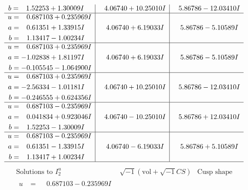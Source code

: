 \documentclass[1p]{elsarticle_modified}
\theoremstyle{definition}
\newcommand{\I}{\sqrt{-1}}
\begin{document}
$$\begin{array}{c|c|c}
\begin{aligned}
b &= \phantom{-}1.52253 + 1.30009 I\end{aligned}
 & \phantom{-}4.06740 + 10.25010 I & \phantom{-}5.86786 - 12.03410 I \\ \hline\begin{aligned}
u &= \phantom{-}0.687103 + 0.235969 I \\
a &= \phantom{-}0.61351 + 1.33915 I \\
b &= \phantom{-}1.13417 - 1.00234 I\end{aligned}
 & \phantom{-}4.06740 + 6.19033 I & \phantom{-}5.86786 - 5.10589 I \\ \hline\begin{aligned}
u &= \phantom{-}0.687103 + 0.235969 I \\
a &= -1.02838 + 1.81197 I \\
b &= -0.105545 - 1.064900 I\end{aligned}
 & \phantom{-}4.06740 + 6.19033 I & \phantom{-}5.86786 - 5.10589 I \\ \hline\begin{aligned}
u &= \phantom{-}0.687103 + 0.235969 I \\
a &= -2.56334 - 1.01181 I \\
b &= -0.246555 + 0.624356 I\end{aligned}
 & \phantom{-}4.06740 + 10.25010 I & \phantom{-}5.86786 - 12.03410 I \\ \hline\begin{aligned}
u &= \phantom{-}0.687103 - 0.235969 I \\
a &= \phantom{-}0.041834 + 0.923046 I \\
b &= \phantom{-}1.52253 - 1.30009 I\end{aligned}
 & \phantom{-}4.06740 - 10.25010 I & \phantom{-}5.86786 + 12.03410 I \\ \hline\begin{aligned}
u &= \phantom{-}0.687103 - 0.235969 I \\
a &= \phantom{-}0.61351 - 1.33915 I \\
b &= \phantom{-}1.13417 + 1.00234 I\end{aligned}
 & \phantom{-}4.06740 - 6.19033 I & \phantom{-}5.86786 + 5.10589 I\\
 \hline 
 \end{array}$$\newpage$$\begin{array}{c|c|c}  
\text{Solutions to }I^u_{2}& \I (\text{vol} + \sqrt{-1}CS) & \text{Cusp shape}\\
 \hline 
\begin{aligned}
u &= \phantom{-}0.687103 - 0.235969 I \\

\end{aligned}
\end{array}$$
\end{document}
